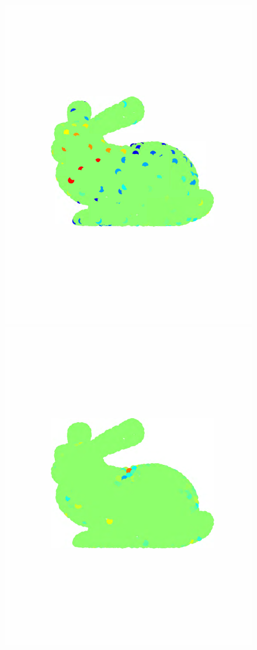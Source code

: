 \documentclass[journal, 10pt]{IEEEtran}
\begin{document}
\begin{figure}[bth]
\begin{minipage}[m]{0.16\linewidth}
\centerline{\includegraphics[width=.8\linewidth]{fig_bunny_coef_scaling}}
\end{minipage}
\begin{minipage}[m]{0.16\linewidth}
\centerline{\includegraphics[width=.8\linewidth]{fig_bunny_coef_wav1}}

\end{minipage}
\end{figure}
\end{document}
